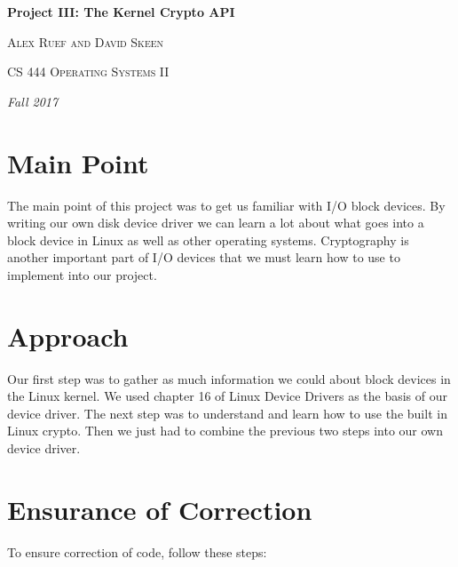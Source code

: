 \documentclass[10pt,drafclsnofoot,onecolumn]{article}
\begin{document}
               
\begin{titlepage}
\centering
{\huge\bfseries Project III: The Kernel Crypto API\par}
\vspace{.5cm}
{\scshape Alex Ruef and David Skeen \par}
\vspace{.5cm}   
{\scshape CS 444 Operating Systems II\par}
\vspace{.5cm} 
{\Large\itshape Fall 2017\par}
\par
\par
\begin{abstract}
In this project we are instructed with creating our own RAM disk device driver.
We must also use Linux's crypto API to encrypt and decrypt our block device.
The device driver must be written as a module that can be moved into a running VM.
In doing so we will learn more about I/O devices and how they interact with the Linux kernel.

\end{abstract}
\end{titlepage}

\section{Main Point}
The main point of this project was to get us familiar with I/O block devices.
By writing our own disk device driver we can learn a lot about what goes into a block device in Linux as well as other operating systems.
Cryptography is another important part of I/O devices that we must learn how to use to implement into our project.

\section{Approach}
Our first step was to gather as much information we could about block devices in the Linux kernel.
We used chapter 16 of Linux Device Drivers as the basis of our device driver\cite{linux_device_drivers}.
The next step was to understand and learn how to use the built in Linux crypto.
Then we just had to combine the previous two steps into our own device driver.

\section{Ensurance of Correction}
To ensure correction of code, follow these steps:
\end{document}
